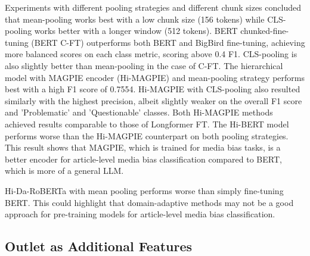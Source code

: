 Experiments with different pooling strategies and different chunk sizes concluded that mean-pooling works best with a low chunk size (156 tokens) while CLS-pooling works better with a longer window (512 tokens). BERT chunked-fine-tuning (BERT C-FT) outperforms both BERT and BigBird fine-tuning, achieving more balanced scores on each class metric, scoring above 0.4 F1. CLS-pooling is also slightly better than mean-pooling in the case of C-FT. The hierarchical model with MAGPIE encoder (Hi-MAGPIE) and mean-pooling strategy performs best with a high F1 score of 0.7554. Hi-MAGPIE with CLS-pooling also resulted similarly with the highest precision, albeit slightly weaker on the overall F1 score and 'Problematic' and 'Questionable' classes. Both Hi-MAGPIE methods achieved results comparable to those of Longformer FT. The Hi-BERT model performs worse than the Hi-MAGPIE counterpart on both pooling strategies. This result shows that MAGPIE, which is trained for media bias tasks, is a better encoder for article-level media bias classification compared to BERT, which is more of a general LLM.

Hi-Da-RoBERTa with mean pooling performs worse than simply fine-tuning BERT. This could highlight that domain-adaptive methods may not be a good approach for pre-training models for article-level media bias classification.

\subsection{Outlet as Additional Features}

